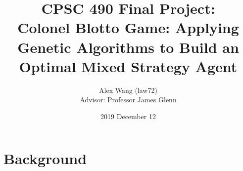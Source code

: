 \documentclass[12pt,letter]{article}
\begin{document}


\title{CPSC 490 Final Project: \\
       Colonel Blotto Game: Applying Genetic Algorithms to Build an Optimal Mixed Strategy Agent}

\author{Alex Wang (law72)\\
   		Advisor: Professor James Glenn}

\date{2019 December 12}
 
\maketitle 
\newtheorem{lemma}[theorem]{Lemma}
\newtheorem{prop}{Proposition}

\newcommand{\R}{\mathbb{R}}
\newcommand{\Z}{\mathbb{Z}}
\newcommand{\N}{\mathbb{N}}
\newcommand{\C}{\mathbb{C}}
\newcommand{\Q}{\mathbb{Q}}
\newcommand{\F}{\mathbb{F}}
\newcommand{\K}{\mathcal{K}}
\newcommand{\IdTwo}{\begin{pmatrix} 1 & 0\\0 & 1 \end{pmatrix}}
\newcommand{\abs}[1]{\left| #1 \right|}

\newcommand{\twodiagmat}[2]{\begin{pmatrix} #1 & 0\\0 & #2 \end{pmatrix}}
\newcommand{\pf}{\vskip 5pt \noindent \textit{Proof. }}
\newcommand{\sol}{\vskip 5pt \noindent \textit{Solution. }}

\newcommand{\pfi}{\vskip 5pt \noindent \textit{Proof by induction. }}
\renewcommand{\qed}{\hfill $\square$}
\newcommand{\assoc}{\text{ [associativity]}}
\newcommand{\aut}{\text{Aut}}
\newcommand{\inn}{\text{Inn}}
\newcommand\barbelow[1]{\stackunder[1.2pt]{$#1$}{\rule{.8ex}{.075ex}}}

\newcommand{\glv}{\text{GL}(V)}
\newcommand{\gln}{\text{GL}_n(\F_p)}
\newcommand{\Mod}[1]{\ (\mathrm{mod}\ #1)}
\newcommand{\Var}[1]{\mathrm{Var}(#1)}
\newcommand{\w}[1]{\overline{#1}}
\newcommand{\eet}{e^{i\theta}}
\newcommand{\eent}{e^{-i\theta}}
\newcommand{\eit}{e^{it}}
\newcommand{\enit}{e^{-it}}

\newcommand{\interior}[1]{%
  {\kern0pt#1}^{\mathrm{o}}%
}

\section{Background} %
\end{document}
